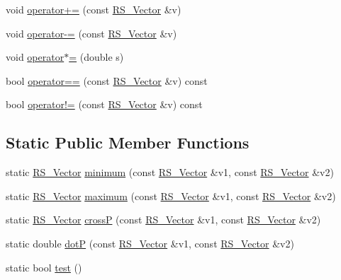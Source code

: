 \begin{DoxyCompactItemize}
\item 
void \hyperlink{class_r_s___vector_a10f89437491fcd25a980a63ce50f1755}{operator+=} (const \hyperlink{class_r_s___vector}{R\-S\-\_\-\-Vector} \&v)
\item 
void \hyperlink{class_r_s___vector_a22412abd21eeb0efb7449ab15e55812e}{operator-\/=} (const \hyperlink{class_r_s___vector}{R\-S\-\_\-\-Vector} \&v)
\item 
void \hyperlink{class_r_s___vector_a3e5be689e9b8474eab7b6b3049eeafa6}{operator$\ast$=} (double s)
\item 
bool \hyperlink{class_r_s___vector_abe3cbb071537621e39da1acdb3e33b47}{operator==} (const \hyperlink{class_r_s___vector}{R\-S\-\_\-\-Vector} \&v) const 
\item 
bool \hyperlink{class_r_s___vector_a12bfb0e59793801580c9d49cf0cc6801}{operator!=} (const \hyperlink{class_r_s___vector}{R\-S\-\_\-\-Vector} \&v) const 
\end{DoxyCompactItemize}
\subsection*{Static Public Member Functions}
\begin{DoxyCompactItemize}
\item 
static \hyperlink{class_r_s___vector}{R\-S\-\_\-\-Vector} \hyperlink{class_r_s___vector_afe4b62f61178fbb7bb7df6992bcaf8fd}{minimum} (const \hyperlink{class_r_s___vector}{R\-S\-\_\-\-Vector} \&v1, const \hyperlink{class_r_s___vector}{R\-S\-\_\-\-Vector} \&v2)
\item 
static \hyperlink{class_r_s___vector}{R\-S\-\_\-\-Vector} \hyperlink{class_r_s___vector_ab7a0ecea9fe56ee20f19be07602fdbb7}{maximum} (const \hyperlink{class_r_s___vector}{R\-S\-\_\-\-Vector} \&v1, const \hyperlink{class_r_s___vector}{R\-S\-\_\-\-Vector} \&v2)
\item 
static \hyperlink{class_r_s___vector}{R\-S\-\_\-\-Vector} \hyperlink{class_r_s___vector_af3b9647c346417f1a2efb487d20db0b9}{cross\-P} (const \hyperlink{class_r_s___vector}{R\-S\-\_\-\-Vector} \&v1, const \hyperlink{class_r_s___vector}{R\-S\-\_\-\-Vector} \&v2)
\item 
static double \hyperlink{class_r_s___vector_ab2e190b72ae65bbdb30ffe1b3685bd2b}{dot\-P} (const \hyperlink{class_r_s___vector}{R\-S\-\_\-\-Vector} \&v1, const \hyperlink{class_r_s___vector}{R\-S\-\_\-\-Vector} \&v2)
\item 
static bool \hyperlink{class_r_s___vector_a4a976b78f67964e2c0c4373be3e3242b}{test} ()
\end{DoxyCompactItemize}
